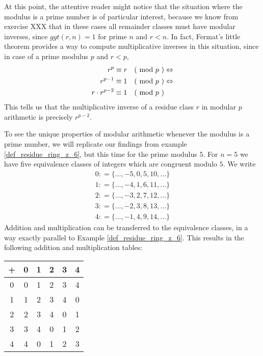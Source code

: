 At this point, the attentive reader might notice that the situation where the modulus is a prime number is of particular interest, because we know from exercise XXX that in these cases all remainder classes must have modular inverses, since $ggt(r,n)=1$ for prime $n$ and $r<n$. In fact, Fermat's little theorem provides a way to compute multiplicative inverses in this situation, since in case of a prime modulus $p$ and $r<p$, 
\begin{align*}
r^p \equiv r \quad \text{( mod } p \text{ )} & \Leftrightarrow \\
r^{p-1} \equiv 1 \quad \text{( mod } p \text{ )} & \Leftrightarrow \\
r\cdot r^{p-2} \equiv 1 \quad \text{( mod } p \text{ )}
\end{align*}
This tells us that the multiplicative inverse of a residue class $r$ in modular $p$ arithmetic is precisely $r^{p-2}$.
\begin{example}  
\label{primfield_z_5}
To see the unique properties of modular arithmetic whenever the modulus is a prime number, we will replicate our findings from example \ref{def_residue_ring_z_6}, but this time for the prime modulus $5$.
For $ n = 5 $ we have five equivalence classes of integers which are congruent modulo $ 5 $. We write
$$
\begin{array}{ccc}
0: = \{\ldots, -5,0,5,10, \ldots \}\\
1: = \{\ldots, -4,1,6,11, \ldots \}\\
2: = \{\ldots, -3,2,7,12, \ldots \} \\
3: = \{\ldots, -2,3,8,13, \ldots \}\\
4: = \{\ldots, -1,4,9,14, \ldots \}
\end{array}
$$
Addition and multiplication can be transferred to the equivalence classes, in a way exactly parallel to Example \ref{def_residue_ring_z_6}. This results in the following addition and multiplication tables:
\begin{center}
  \begin{tabular}{c | c c c c c}
    + & 0 & 1 & 2 & 3 & 4 \\\hline
    0 & 0 & 1 & 2 & 3 & 4 \\
    1 & 1 & 2 & 3 & 4 & 0 \\
    2 & 2 & 3 & 4 & 0 & 1 \\
    3 & 3 & 4 & 0 & 1 & 2 \\
    4 & 4 & 0 & 1 & 2 & 3 \\
  \end{tabular} \quad \quad \quad \quad
  \begin{tabular}{c | c c c c c}

\end{tabular}
\end{center}
\end{example}
